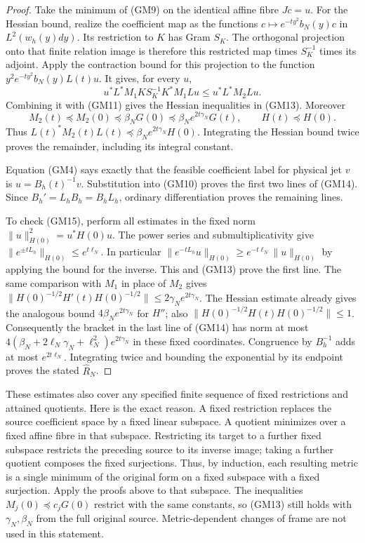 \begin{proof}
Take the minimum of (GM9) on the identical affine fibre $Jc=u$.
For the Hessian bound, realize the coefficient map as the functions
$c\mapsto e^{-ty^2}b_N(y)c$ in $L^2(w_h(y)dy)$.  Its restriction to
$K$ has Gram $S_K$.  The orthogonal projection onto that finite
relation image is therefore this restricted map times $S_K^{-1}$
times its adjoint.  Apply the contraction bound for this projection
to the function $y^2e^{-ty^2}b_N(y)L(t)u$.  It gives, for every $u$,
\[
 u^*L^*M_1K S_K^{-1}K^*M_1Lu\leq u^*L^*M_2Lu.
\]
Combining it with (GM11) gives the Hessian inequalities in (GM13).
Moreover
\[
 M_2(t)\preceq M_2(0)\preceq\beta_NG(0)
       \preceq\beta_Ne^{2t\gamma_N}G(t),
 \qquad H(t)\preceq H(0).
\]
Thus $L(t)^*M_2(t)L(t)\preceq
\beta_Ne^{2t\gamma_N}H(0)$.  Integrating the Hessian bound twice
proves the remainder, including its integral constant.

Equation (GM4) says exactly that the feasible coefficient label for
physical jet $v$ is $u=B_h(t)^{-1}v$.  Substitution into (GM10) proves
the first two lines of (GM14).  Since $B_h'=L_hB_h=B_hL_h$,
ordinary differentiation proves the remaining lines.

To check (GM15), perform all estimates in the fixed norm
$\|u\|_{H(0)}^2=u^*H(0)u$.  The power series and submultiplicativity
give $\|e^{\pm tL_h}\|_{H(0)}\leq e^{t\ell_N}$.  In particular
$\|e^{-tL_h}u\|_{H(0)}\geq e^{-t\ell_N}\|u\|_{H(0)}$ by applying
the bound for the inverse.  This and (GM13) prove the first line.
The same comparison with $M_1$ in place of $M_2$ gives
$\|H(0)^{-1/2}H'(t)H(0)^{-1/2}\|
\leq2\gamma_Ne^{2t\gamma_N}$.  The Hessian estimate already gives
the analogous bound $4\beta_Ne^{2t\gamma_N}$ for $H''$; also
$\|H(0)^{-1/2}H(t)H(0)^{-1/2}\|\leq1$.
Consequently the bracket in the last line of (GM14) has norm at most
$4(\beta_N+2\ell_N\gamma_N+\ell_N^2)e^{2t\gamma_N}$ in these fixed
coordinates.  Congruence by $B_h^{-1}$ adds at most $e^{2t\ell_N}$.
Integrating twice and bounding the exponential by its endpoint
proves the stated $\widehat R_N$.
\end{proof}

These estimates also cover any specified finite sequence of fixed
restrictions and attained quotients.  Here is the exact reason.
A fixed restriction replaces the source coefficient space by a fixed
linear subspace.  A quotient minimizes over a fixed affine fibre in
that subspace.  Restricting its target to a further fixed subspace
restricts the preceding source to its inverse image; taking a further
quotient composes the fixed surjections.  Thus, by induction, each
resulting metric is a single minimum of the original form on a fixed
subspace with a fixed surjection.  Apply the proofs above to that
subspace.  The inequalities $M_j(0)\preceq c_jG(0)$ restrict with the
same constants, so (GM13) still holds with $\gamma_N,\beta_N$ from
the full original source.  Metric-dependent changes of frame are
not used in this statement.

